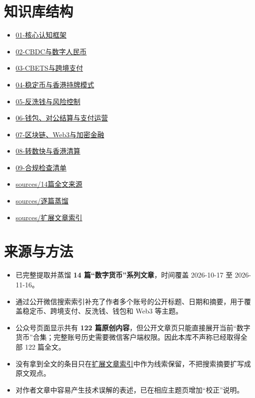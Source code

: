 \section{知识库结构}\label{ux77e5ux8bc6ux5e93ux7ed3ux6784}

\begin{itemize}
\tightlist
\item
  \href{01-核心认知框架.md}{01-核心认知框架}
\item
  \href{02-CBDC与数字人民币.md}{02-CBDC与数字人民币}
\item
  \href{03-CBETS与跨境支付.md}{03-CBETS与跨境支付}
\item
  \href{04-稳定币与香港持牌模式.md}{04-稳定币与香港持牌模式}
\item
  \href{05-反洗钱与风险控制.md}{05-反洗钱与风险控制}
\item
  \href{06-钱包、对公结算与支付运营.md}{06-钱包、对公结算与支付运营}
\item
  \href{07-区块链、Web3与加密金融.md}{07-区块链、Web3与加密金融}
\item
  \href{08-转数快与香港清算.md}{08-转数快与香港清算}
\item
  \href{09-合规检查清单.md}{09-合规检查清单}
\item
  \href{sources/14篇全文来源.md}{sources/14篇全文来源}
\item
  \href{sources/逐篇蒸馏.md}{sources/逐篇蒸馏}
\item
  \href{sources/扩展文章索引.md}{sources/扩展文章索引}
\end{itemize}

\section{来源与方法}\label{ux6765ux6e90ux4e0eux65b9ux6cd5}

\begin{itemize}
\tightlist
\item
  已完整提取并蒸馏 \textbf{14 篇``数字货币''系列文章}，时间覆盖 2026-10-17 至
  2026-11-16。
\item
  通过公开微信搜索索引补充了作者多个账号的公开标题、日期和摘要，用于覆盖稳定币、跨境支付、反洗钱、钱包和
  Web3 等主题。
\item
  公众号页面显示共有 \textbf{122
  篇原创内容}，但公开文章页只能直接展开当前``数字货币''合集；完整账号历史需要微信客户端权限。因此本库不声称已经取得全部
  122 篇全文。
\item
  没有拿到全文的条目只在\href{sources/扩展文章索引.md}{扩展文章索引}中作为线索保留，不把搜索摘要扩写成原文观点。
\item
  对作者文章中容易产生技术误解的表述，已在相应主题页增加``校正''说明。
\end{itemize}

